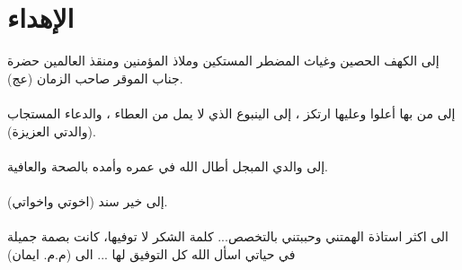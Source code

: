 \chapter*{الإهداء}
إلى الكهف الحصين وغياث المضطر المستكين وملاذ المؤمنين ومنقذ العالمين حضرة جناب الموقر صاحب الزمان (عج).\\
\\
إلى من بها أعلوا وعليها ارتكز ، إلى الينبوع الذي لا يمل من العطاء ، والدعاء المستجاب (والدتي العزيزة).\\
\\
إلى والدي المبجل أطال الله في عمره وأمده بالصحة والعافية.\\
\\
إلى خير سند (اخوتي واخواتي).\\
\\
الى اكثر استاذة الهمتني وحببتني بالتخصص... كلمة الشكر لا توفيها، كانت بصمة جميلة في حياتي اسأل الله كل التوفيق لها ... الى (م.م. ايمان)  
